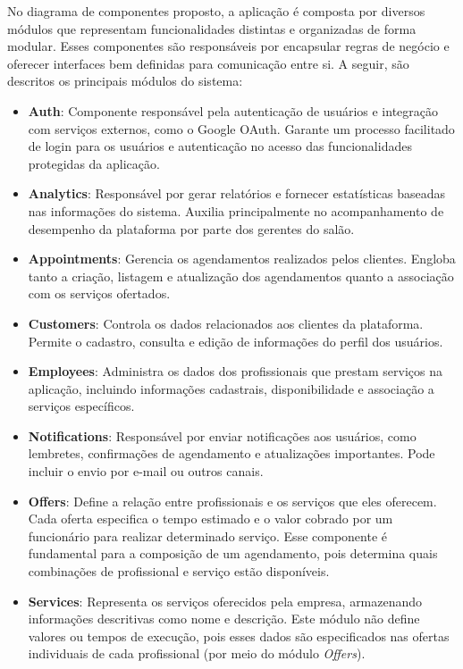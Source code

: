 No diagrama de componentes proposto, a aplicação é composta por diversos módulos que representam funcionalidades distintas e organizadas de forma modular. Esses componentes são responsáveis por encapsular regras de negócio e oferecer interfaces bem definidas para comunicação entre si. A seguir, são descritos os principais módulos do sistema:

\begin{itemize}
  \item \textbf{Auth}: Componente responsável pela autenticação de usuários e integração com serviços externos, como o Google OAuth. Garante um processo facilitado de login para os usuários e autenticação no acesso das funcionalidades protegidas da aplicação.

  \item \textbf{Analytics}: Responsável por gerar relatórios e fornecer estatísticas baseadas nas informações do sistema. Auxilia principalmente no acompanhamento de desempenho da plataforma por parte dos gerentes do salão.

  \item \textbf{Appointments}: Gerencia os agendamentos realizados pelos clientes. Engloba tanto a criação, listagem e atualização dos agendamentos quanto a associação com os serviços ofertados.

  \item \textbf{Customers}: Controla os dados relacionados aos clientes da plataforma. Permite o cadastro, consulta e edição de informações do perfil dos usuários.

  \item \textbf{Employees}: Administra os dados dos profissionais que prestam serviços na aplicação, incluindo informações cadastrais, disponibilidade e associação a serviços específicos.

  \item \textbf{Notifications}: Responsável por enviar notificações aos usuários, como lembretes, confirmações de agendamento e atualizações importantes. Pode incluir o envio por e-mail ou outros canais.

  \item \textbf{Offers}: Define a relação entre profissionais e os serviços que eles oferecem. Cada oferta especifica o tempo estimado e o valor cobrado por um funcionário para realizar determinado serviço. Esse componente é fundamental para a composição de um agendamento, pois determina quais combinações de profissional e serviço estão disponíveis.

  \item \textbf{Services}: Representa os serviços oferecidos pela empresa, armazenando informações descritivas como nome e descrição. Este módulo não define valores ou tempos de execução, pois esses dados são especificados nas ofertas individuais de cada profissional (por meio do módulo \textit{Offers}).


\end{itemize}
